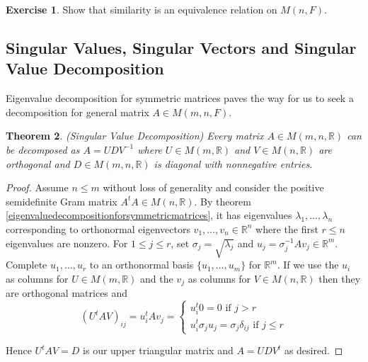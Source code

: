 \documentclass[12pt]{amsart}
\newtheorem{theorem}{Theorem}[section]
\theoremstyle{definition}
\newtheorem{exercise}[theorem]{Exercise}
\begin{document}
\begin{exercise}\label{} Show that similarity is an equivalence relation on $M(n, F)$.
\end{exercise}

\subsection{Singular Values, Singular Vectors and Singular Value Decomposition} Eigenvalue decomposition for symmetric matrices paves the way for us to seek a decomposition for general matrix $A \in M(m, n, F)$.

\begin{theorem}\label{singularvaluedecomposition} (Singular Value Decomposition) Every matrix $A \in M(m, n, \mathbb{R})$ can be decomposed as $A = UDV^{-1}$ where $U \in M(m, \mathbb{R})$ and $V \in M(n, \mathbb{R})$ are orthogonal and $D \in M(m, n, \mathbb{R})$ is diagonal with nonnegative entries.
\end{theorem}
\begin{proof} Assume $n \leq m$ without loss of generality and consider the positive semidefinite Gram matrix $A^tA \in M(n, \mathbb{R})$. By theorem \ref{eigenvaluedecompositionforsymmetricmatrices}, it has eigenvalues $\lambda_1, \dots , \lambda_n$ corresponding to orthonormal eigenvectors $v_1, \dots , v_n \in \mathbb{R}^n$ where the first $r \leq n$ eigenvalues are nonzero. For $1 \leq j \leq r$, set $\sigma_j = \sqrt{\lambda_j}$ and $u_j = \sigma_j^{-1} Av_j \in \mathbb{R}^m$. Complete $u_1, \dots , u_r$ to an orthonormal basis $\{u_1, \dots , u_m\}$ for $\mathbb{R}^m$. If we use the $u_i$ as columns for $U \in M(m, \mathbb{R})$ and the $v_j$ as columns for $V \in M(n, \mathbb{R})$ then they are orthogonal matrices and
$$(U^tAV)_{ij} = u_i^tAv_j = \begin{cases} u_i^t 0 = 0 \text{ if } j > r \\ u_i^t \sigma_j u_j = \sigma_j \delta_{ij} \text{ if } j \leq r \end{cases}$$

Hence $U^tAV = D$ is our upper triangular matrix and $A = UDV^t$ as desired.
\end{proof}
\end{document}
